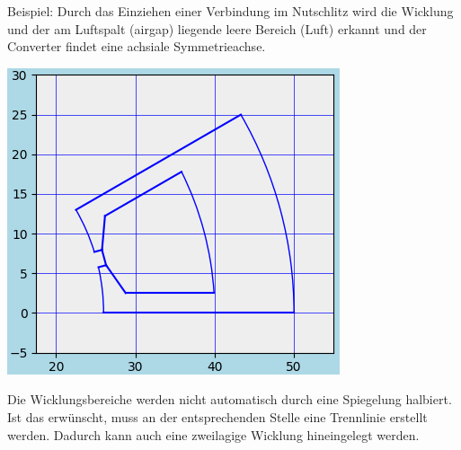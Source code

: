 \documentclass[10pt, a4paper,german]{scrartcl}
\begin{document}
Beispiel: Durch das Einziehen einer Verbindung im Nutschlitz
 wird die Wicklung und der am Luftspalt (airgap) liegende leere Bereich
(Luft) erkannt und der Converter findet eine achsiale Symmetrieachse.
\begin{center}
\includegraphics[width=0.45\linewidth]{BspWindings}
\end{center}
Die Wicklungsbereiche werden nicht automatisch durch eine Spiegelung halbiert. Ist das erwünscht,
muss an der entsprechenden Stelle eine Trennlinie erstellt werden.
Dadurch kann auch eine zweilagige Wicklung hineingelegt werden.
\end{document}
